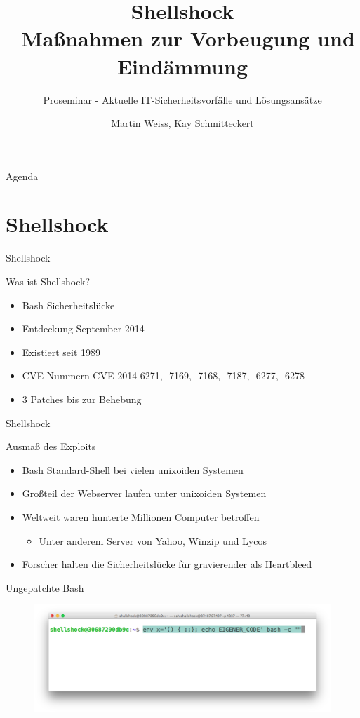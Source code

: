 \documentclass[handout]{beamer}
\title[Shellshock]{Shellshock \\ Ma{\ss}nahmen zur Vorbeugung und Eind\"ammung}
\subtitle{Proseminar - Aktuelle IT-Sicherheitsvorf\"alle und L\"osungsans\"atze}
\author{Martin Weiss, Kay Schmitteckert}
\institute{Forschungsgruppe Dezentrale Systeme und Netzdienste - TM \& SCC}
\begin{document}

\begin{frame}
\titlepage
\end{frame}

\begin{frame}{Agenda}
\tableofcontents
\end{frame}

\section{Shellshock}
\begin{frame}{Shellshock}
\begin{block}{Was ist Shellshock?}
  \begin{itemize}[<+->]
    \item Bash Sicherheitslücke
    \item Entdeckung September 2014
    \item Existiert seit 1989
    \item CVE-Nummern CVE-2014-6271, -7169, -7168, -7187, -6277, -6278
    \item 3 Patches bis zur Behebung
  \end{itemize}
\end{block}
\end{frame}

\begin{frame}{Shellshock}
\begin{block}{Ausmaß des Exploits}
\begin{itemize}[<+->]
\item Bash Standard-Shell bei vielen unixoiden Systemen
\item Großteil der Webserver laufen unter unixoiden Systemen
\item Weltweit waren hunterte Millionen Computer betroffen
\begin{itemize}
  \item Unter anderem Server von Yahoo, Winzip und Lycos
\end{itemize}
\item Forscher halten die Sicherheitslücke für gravierender als Heartbleed
\end{itemize}
\end{block}
\end{frame}

\begin{frame}{Ungepatchte Bash}
\begin{figure}
  \centering
    \includegraphics[width=1\textwidth]{assets/example1}
\end{figure}
\end{frame}
\end{document}
